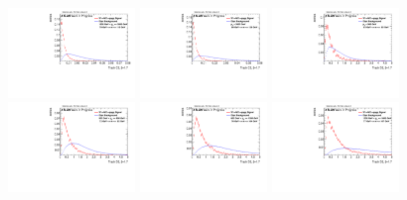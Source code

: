 \begin{figure}[H]
\includegraphics[width=0.3\textwidth]{sascha_input/Appendix/Distributions/w/distributions/beta17/h_normal_tj_C2_17_bin5.pdf} \hspace{1mm}
\includegraphics[width=0.3\textwidth]{sascha_input/Appendix/Distributions/w/distributions/beta17/h_normal_tj_C2_17_bin6.pdf} 
\bigskip
\includegraphics[width=0.3\textwidth]{sascha_input/Appendix/Distributions/w/distributions/beta17/h_normal_tj_D2_17_bin1.pdf} \hspace{1mm}
\includegraphics[width=0.3\textwidth]{sascha_input/Appendix/Distributions/w/distributions/beta17/h_normal_tj_D2_17_bin2.pdf} \hspace{1mm}
\includegraphics[width=0.3\textwidth]{sascha_input/Appendix/Distributions/w/distributions/beta17/h_normal_tj_D2_17_bin3.pdf} 
\bigskip
\includegraphics[width=0.3\textwidth]{sascha_input/Appendix/Distributions/w/distributions/beta17/h_normal_tj_D2_17_bin4.pdf} \hspace{1mm}

\end{figure}

